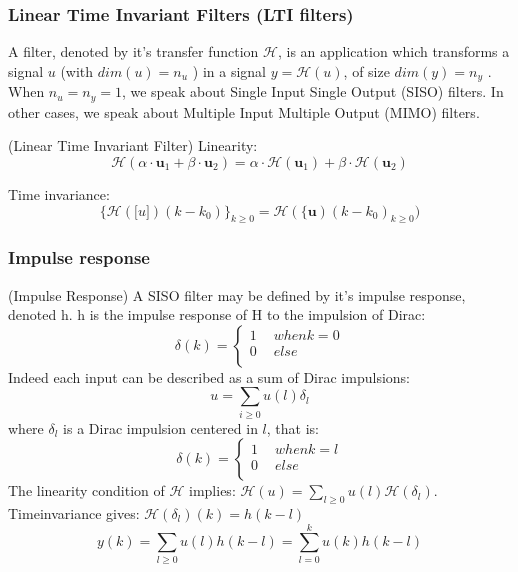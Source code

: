 	\subsubsection{Linear Time Invariant Filters (LTI filters)}
	A filter, denoted by it’s transfer function $\mathcal{H}$, is an application which transforms a signal $u$ (with $dim(u) = n_u$ )
	in a signal $y = \mathcal{H}(u)$, of size $dim(y) = n_y$ . When $n_u = n_y = 1$, we speak about Single Input Single Output
	(SISO) filters. In other cases, we speak about Multiple Input Multiple Output (MIMO) filters.

	\begin{thdef} (Linear Time Invariant Filter)
		Linearity:
		$$ \mathcal{H}(\alpha \cdot \boldsymbol{u}_1+ \beta \cdot \boldsymbol{u}_2)= \alpha\cdot\mathcal{H}(\boldsymbol{u}_1) +  \beta\cdot\mathcal{H}(\boldsymbol{u}_2)$$

		Time invariance:
		$$ \{\mathcal{H}(\boldsymbol[u])(k-k_0)\}_{k\geq0} = \mathcal{H}(\{\boldsymbol{u})(k-k_0)_{k \geq 0} ) $$
	\end{thdef}

	\subsubsection{Impulse response}
	\begin{thdef} (Impulse Response)
	A SISO filter may be defined by it’s impulse response, denoted h. h is the
	impulse response of H to the impulsion of Dirac:
	\begin{equation}
		\delta(k) =
		\begin{cases}
			1 & \hspace{5pt} when k=0\\
			0 & \hspace{5pt} else\\
		\end{cases}
	\end{equation}
	Indeed each input can be described as a sum of Dirac impulsions:
	$$u=\sum_{i\geq0}u(l)\delta_l$$
	where $\delta_l$ is a Dirac impulsion centered in $l$, that is:
	\begin{equation}
		\delta(k) =
		\begin{cases}
			1 & \hspace{5pt} when k=l\\
			0 & \hspace{5pt} else\\
		\end{cases}
	\end{equation}
	The linearity condition of $\mathcal{H}$ implies: $\mathcal{H}(u) = \sum_{l\geq0}u(l)\mathcal{H}(\delta_l)$.
	Timeinvariance gives: $\mathcal{H}(\delta_l)(k)=h(k-l)$
	$$y(k)=\sum_{l\geq0}u(l)h(k-l)=\sum_{l=0}^ku(k)h(k-l)$$
	
	\end{thdef} 


